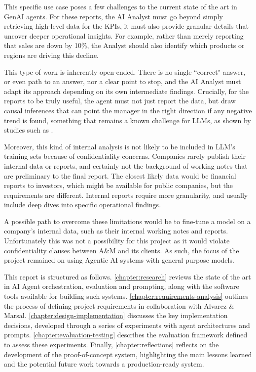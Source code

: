 \documentclass[a4paper]{report}
\begin{document}
This specific use case poses a few challenges to the current state of the art in GenAI agents. For these reports, the AI Analyst must go beyond simply retrieving high-level data for the KPIs, it must also provide granular details that uncover deeper operational insights. For example, rather than merely reporting that sales are down by 10\%, the Analyst should also identify which products or regions are driving this decline.

This type of work is inherently open-ended. There is no single ``correct" answer, or even path to an answer, nor a clear point to stop, and the AI Analyst must adapt its approach depending on its own intermediate findings. Crucially, for the reports to be truly useful, the agent must not just report the data, but draw causal inferences that can point the manager in the right direction if any negative trend is found, something that remains a known challenge for LLMs, as shown by studies such as \cite{llmcausalreasoning2024}.

Moreover, this kind of internal analysis is not likely to be included in LLM's training sets because of confidentiality concerns. Companies rarely publish their internal data or reports, and certainly not the background of working notes that are preliminary to the final report. The closest likely data would be financial reports to investors, which might be available for public companies, but the requirements are different. Internal reports require more granularity, and usually include deep dives into specific operational findings.

A possible path to overcome these limitations would be to fine-tune a model on a company's internal data, such as their internal working notes and reports. Unfortunately this was not a possibility for this project as it would violate confidentiality clauses between A\&M and its clients. As such, the focus of the project remained on using Agentic AI systems with general purpose models.

This report is structured as follows. \autoref{chapter:research} reviews the state of the art in AI Agent orchestration, evaluation and prompting, along with the software tools available for building such systems. \autoref{chapter:requirements-analysis} outlines the process of defining project requirements in collaboration with Alvarez \& Marsal. \autoref{chapter:design-implementation} discusses the key implementation decisions, developed through a series of experiments with agent architectures and prompts. \autoref{chapter:evaluation-testing} describes the evaluation framework defined to assess these experiments. Finally, \autoref{chapter:reflections} reflects on the development of the proof-of-concept system, highlighting the main lessons learned and the potential future work towards a production-ready system.
\end{document}
